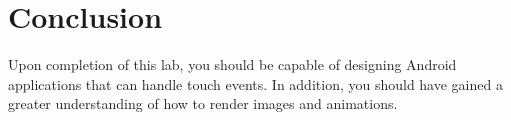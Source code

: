 \section{Conclusion}

Upon completion of this lab, you should be capable of designing Android applications that can handle touch events.
In addition, you should have gained a greater understanding of how to render images and animations.